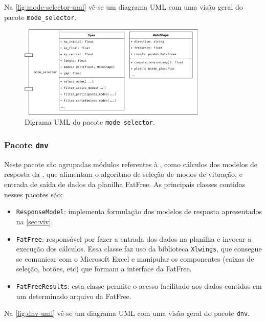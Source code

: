Na \autoref{fig:mode-selector-uml} vê-se um diagrama UML com uma visão geral do pacote \texttt{mode\_selector}.

\begin{figure}[!ht]
    \centering
    \caption{Digrama UML do pacote \texttt{mode\_selector}.}\label{fig:mode-selector-uml}
    \includegraphics[width=0.8\textwidth]{imagens/mode-selector-uml}
\end{figure}


\subsubsection{Pacote \texttt{dnv}}

Neste pacote são agrupadas módulos referentes à , como cálculos dos modelos de resposta da , que alimentam o algorítmo de seleção de modos de vibração, e entrada de saída de dados da planilha FatFree. As principais classes contidas nesses pacotes são:

\begin{itemize}
    \item \texttt{ResponseModel}: implementa formulação dos modelos de resposta apresentados na \autoref{sec:viv}.

    \item \texttt{FatFree}: responsável por fazer a entrada dos dados na planilha e invocar a execução dos cálculos. Essa classe faz uso da biblioteca \texttt{Xlwings}, que consegue se comunicar com o Microsoft Excel e manipular os componentes (caixas de seleção, botões, etc) que formam a interface da FatFree.

    \item \texttt{FatFreeResults}: esta classe permite o acesso facilitado aos dados contidos em um determinado arquivo da FatFree.
\end{itemize}

Na \autoref{fig:dnv-uml} vê-se um diagrama UML com uma visão geral do pacote \texttt{dnv}.

